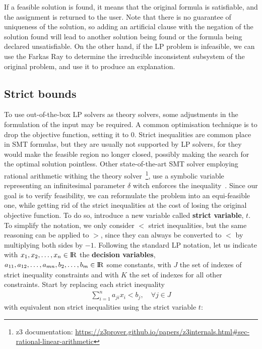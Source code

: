 \documentclass[runningheads]{llncs}
\begin{document}
If a feasible solution is found, it means that the original formula is satisfiable, and the assignment is returned to the user.
Note that there is no guarantee of uniqueness of the solution, so adding an artificial clause with the negation of the solution found will lead to another solution being found or the formula being declared unsatisfiable.
On the other hand, if the LP problem is infeasible, we can use the Farkas Ray to determine the irreducible inconsistent subsystem of the original problem, and use it to produce an explanation.

\subsection{Strict bounds}
\label{sec:strict-bounds}

To use out-of-the-box LP solvers as theory solvers, some adjustments in the formulation of the input may be required.
A common optimisation technique is to drop the objective function, setting it to $0$.
Strict inequalities are common place in SMT formulas, but they are usually not supported by LP solvers, for they would make the feasible region no longer closed, possibly making the search for the optimal solution pointless.
Other state-of-the-art SMT solver employing rational arithmetic withing the theory solver~\footnote{z3 documentation: \url{https://z3prover.github.io/papers/z3internals.html\#sec-rational-linear-arithmetic}}, use a symbolic variable representing an infinitesimal parameter $\delta$ witch enforces the inequality~\cite{ref:lra-dpll-t}.
Since our goal is to verify feasibility, we can reformulate the problem into an equi-feasible one, while getting rid of the strict inequalities at the cost of losing the original objective function.
To do so, introduce a new variable called \textbf{strict variable}, $t$.
To simplify the notation, we only consider $<$ strict inequalities, but the same reasoning can be applied to $>$, since they can always be converted to $<$ by multiplying both sides by $-1$.
Following the standard LP notation, let us indicate with $x_1, x_2, \ldots, x_n \in {\rm I\!R}$ the \textbf{decision variables}, $a_{11}, a_{12}, \ldots, a_{mn}, b_{2}, \ldots, b_{m}\in {\rm I\!R}$ some constants, with $J$ the set of indexes of strict inequality constraints and with $K$ the set of indexes for all other constraints.
Start by replacing each strict inequality
\begin{align*}
    \sum_{i=1}^{n} a_{ji}x_{i} < b_j, \quad \forall j \in J
\end{align*}
with equivalent non strict inequalities using the strict variable $t$:
\end{document}
